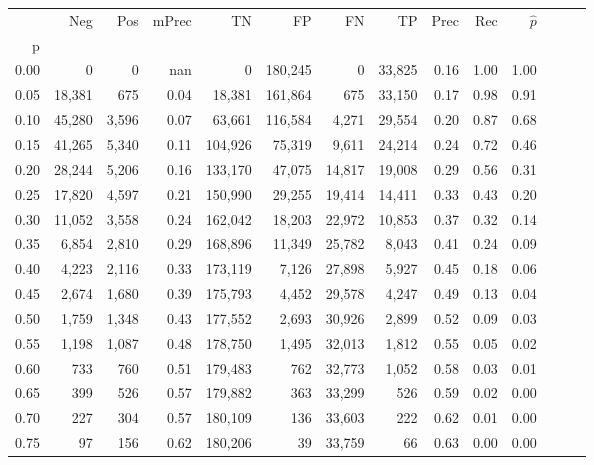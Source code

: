 \begin{tabular}{rrrrrrrrrrrrrr}
\toprule
{} &     Neg &    Pos & mPrec &       TN &       FP &      FN &      TP &  Prec &   Rec & $\hat{p}$ \\
p    &         &        &       &          &          &         &         &       &       &           \\
\midrule
0.00 &       0 &      0 &   nan &        0 &  180,245 &       0 &  33,825 &  0.16 &  1.00 &      1.00 \\
0.05 &  18,381 &    675 &  0.04 &   18,381 &  161,864 &     675 &  33,150 &  0.17 &  0.98 &      0.91 \\
0.10 &  45,280 &  3,596 &  0.07 &   63,661 &  116,584 &   4,271 &  29,554 &  0.20 &  0.87 &      0.68 \\
0.15 &  41,265 &  5,340 &  0.11 &  104,926 &   75,319 &   9,611 &  24,214 &  0.24 &  0.72 &      0.46 \\
0.20 &  28,244 &  5,206 &  0.16 &  133,170 &   47,075 &  14,817 &  19,008 &  0.29 &  0.56 &      0.31 \\
0.25 &  17,820 &  4,597 &  0.21 &  150,990 &   29,255 &  19,414 &  14,411 &  0.33 &  0.43 &      0.20 \\
0.30 &  11,052 &  3,558 &  0.24 &  162,042 &   18,203 &  22,972 &  10,853 &  0.37 &  0.32 &      0.14 \\
0.35 &   6,854 &  2,810 &  0.29 &  168,896 &   11,349 &  25,782 &   8,043 &  0.41 &  0.24 &      0.09 \\
0.40 &   4,223 &  2,116 &  0.33 &  173,119 &    7,126 &  27,898 &   5,927 &  0.45 &  0.18 &      0.06 \\
0.45 &   2,674 &  1,680 &  0.39 &  175,793 &    4,452 &  29,578 &   4,247 &  0.49 &  0.13 &      0.04 \\
0.50 &   1,759 &  1,348 &  0.43 &  177,552 &    2,693 &  30,926 &   2,899 &  0.52 &  0.09 &      0.03 \\
0.55 &   1,198 &  1,087 &  0.48 &  178,750 &    1,495 &  32,013 &   1,812 &  0.55 &  0.05 &      0.02 \\
0.60 &     733 &    760 &  0.51 &  179,483 &      762 &  32,773 &   1,052 &  0.58 &  0.03 &      0.01 \\
0.65 &     399 &    526 &  0.57 &  179,882 &      363 &  33,299 &     526 &  0.59 &  0.02 &      0.00 \\
0.70 &     227 &    304 &  0.57 &  180,109 &      136 &  33,603 &     222 &  0.62 &  0.01 &      0.00 \\
0.75 &      97 &    156 &  0.62 &  180,206 &       39 &  33,759 &      66 &  0.63 &  0.00 &      0.00 \\

\end{tabular}
